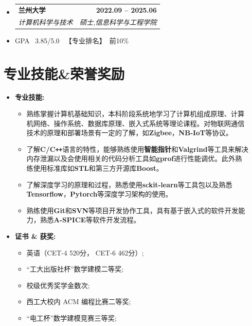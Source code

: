 \documentclass[letterpaper,11pt]{article}
\makeatletter
\newcommand{\resumeItem}[1]{	
	\item\small{
		{#1 \vspace{-2pt}}
	}
}
\newcommand{\resumeSubheading}[4]{
	\vspace{-2pt}\item
	\begin{tabular*}{1.0\textwidth}[t]{l@{\extracolsep{\fill}}r}
		\textbf{\CJKfamily{STSong}#1} & \textbf{\small #2} \\
		\textit{\small\CJKfamily{KaiTi}#3} & \textit{\small #4} \\
	\end{tabular*}\vspace{-7pt}
	
}
\newcommand{\resumeSubHeadingListStart}{\begin{itemize}[leftmargin=0.0in, label={}]}
\newcommand{\resumeSubHeadingListEnd}{\end{itemize}}
\newcommand{\resumeItemListStart}{\begin{itemize}}
\newcommand{\resumeItemListEnd}{\end{itemize}\vspace{-5pt}}
\makeatother
\begin{document}
	\resumeSubHeadingListStart
	\resumeSubheading
	{兰州大学}{2022.09 -- 2025.06}
	{计算机科学与技术}{硕士,信息科学与工程学院}
	\vspace{-2pt}
	\resumeSubHeadingListEnd
	
	\resumeItemListStart	
	\resumeItem{GPA \ 3.85/5.0 \ 【专业排名】\ 前10\%}
	\resumeItemListEnd
	
	\vspace{-8pt}
	
	\section{专业技能\&荣誉奖励}

	\begin{itemize}[leftmargin=0in, label={}]
	\item{\textbf{专业技能:}{
			\vspace{-6pt}
			\begin{itemize}[leftmargin=0.15in]
				\small \item 熟练掌握计算机基础知识，本科阶段系统地学习了计算机组成原理、计算机网络、操作系统、数据库原理、嵌入式系统等理论课程。对物联网通信技术的原理和部署场景有一定的了解，如\textbf{Zigbee}，\textbf{NB-IoT}等协议。
				\small \item
				了解\textbf{C/C\texttt{++}}语言的特性，能够熟练使用\textbf{智能指针}和\textbf{Valgrind}等工具来解决内存泄漏以及会使用相关的代码分析工具如\textbf{gprof}进行性能调优。此外熟练使用标准库如\textbf{STL}和第三方开源库\textbf{Boost}。
				\small \item 
				了解深度学习的原理和过程，熟悉使用\textbf{sckit-learn}等工具包以及熟悉\textbf{Tensorflow}，\textbf{Pytorch}等深度学习架构的使用。
				\small \item 
				熟练使用\textbf{Git}和\textbf{SVN}等项目开发协作工具，具有基于嵌入式的软件开发能力，熟悉\textbf{A-SPICE}等软件开发流程。
			\end{itemize}}
		}
		
	\vspace{-8pt}
	
	\item{\textbf{证书 \& 获奖:}{
			\vspace{3pt}
			\begin{multicols}{2}
				\begin{itemize}[itemsep=-5pt, parsep=5pt]
					\small \item 英语（CET-4 520分， CET-6 462分）;
					\small \item “工大出版社杯”数学建模二等奖;
					\small \item 校级优秀奖学金数次;
					\small \item 西工大校内 ACM 编程比赛二等奖;
					\small \item “电工杯”数学建模竞赛三等奖;
				\end{itemize}
			\end{multicols}}
		}		
			

\end{itemize}
\end{document}
